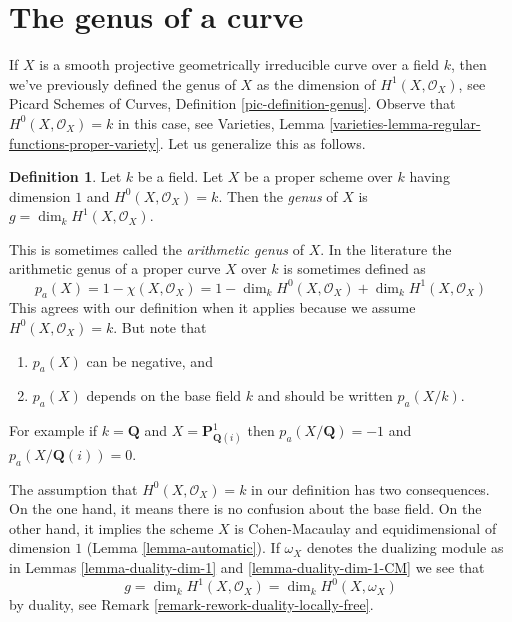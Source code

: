 \documentclass{stacks-project}
\theoremstyle{plain}
\theoremstyle{definition}
\newtheorem{definition}[subsection]{Definition}
\theoremstyle{remark}
\numberwithin{equation}{subsection}
\begin{document}
\section{The genus of a curve}
\label{section-genus}

\noindent
If $X$ is a smooth projective geometrically irreducible curve over a field $k$,
then we've previously defined the genus of $X$ as the dimension of
$H^1(X, \mathcal{O}_X)$, see
Picard Schemes of Curves, Definition \ref{pic-definition-genus}.
Observe that $H^0(X, \mathcal{O}_X) = k$ in this case, see
Varieties, Lemma \ref{varieties-lemma-regular-functions-proper-variety}.
Let us generalize this as follows.

\begin{definition}
\label{definition-genus}
Let $k$ be a field. Let $X$ be a proper scheme over $k$ having
dimension $1$ and $H^0(X, \mathcal{O}_X) = k$.
Then the {\it genus} of $X$ is $g = \dim_k H^1(X, \mathcal{O}_X)$.
\end{definition}

\noindent
This is sometimes called the {\it arithmetic genus} of $X$.
In the literature the arithmetic genus of a proper curve $X$
over $k$ is sometimes defined as
$$
p_a(X) = 1 - \chi(X, \mathcal{O}_X) =
1 - \dim_k H^0(X, \mathcal{O}_X) + \dim_k H^1(X, \mathcal{O}_X)
$$
This agrees with our definition when it applies because we assume
$H^0(X, \mathcal{O}_X) = k$. But note that
\begin{enumerate}
\item $p_a(X)$ can be negative, and
\item $p_a(X)$ depends on the base field $k$ and should be written $p_a(X/k)$.
\end{enumerate}
For example if $k = \mathbf{Q}$
and $X = \mathbf{P}^1_{\mathbf{Q}(i)}$ then
$p_a(X/\mathbf{Q}) = -1$ and $p_a(X/\mathbf{Q}(i)) = 0$.

\medskip\noindent
The assumption that $H^0(X, \mathcal{O}_X) = k$ in our definition has
two consequences. On the one hand, it means there is no confusion about
the base field. On the other hand, it implies the scheme $X$ is
Cohen-Macaulay and equidimensional of dimension $1$
(Lemma \ref{lemma-automatic}). If $\omega_X$ denotes the dualizing
module as in Lemmas \ref{lemma-duality-dim-1} and
\ref{lemma-duality-dim-1-CM} we see that
\begin{equation}
\label{equation-genus}
g = \dim_k H^1(X, \mathcal{O}_X) = \dim_k H^0(X, \omega_X)
\end{equation}
by duality, see Remark \ref{remark-rework-duality-locally-free}.
\end{document}
